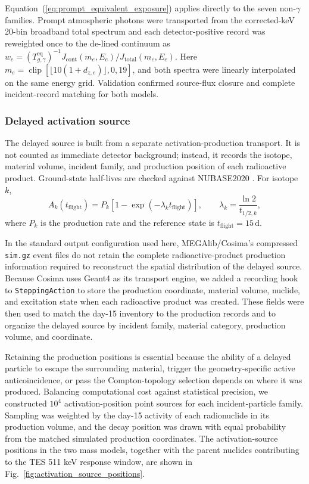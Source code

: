 \documentclass[11pt]{article}
\begin{document}
Equation~(\ref{eq:prompt_equivalent_exposure}) applies directly to the seven
non-$\gamma$ families. Prompt atmospheric photons were transported from the
corrected-keV 20-bin broadband total spectrum and each detector-positive record
was reweighted once to the de-lined continuum as
$w_e=(T^{\mathrm{eq}}_{g,\gamma})^{-1}
J_{\mathrm{cont}}(m_e,E_e)/J_{\mathrm{total}}(m_e,E_e)$. Here
$m_e=\operatorname{clip}[\lfloor10(1+d_{z,e})\rfloor,0,19]$, and both spectra
were linearly interpolated on the same energy grid. Validation confirmed
source-flux closure and complete incident-record matching for both models.

\endgroup

\subsubsection{Delayed activation source}
\label{subsec:delayed_source}

The delayed source is built from a separate activation-production transport. It
is not counted as immediate detector background; instead, it records the isotope,
material volume, incident family, and production position of each radioactive
product. Ground-state half-lives are checked against NUBASE2020
\cite{Kondev2021NUBASE}. For isotope $k$,
\begin{equation}
  A_k(t_{\mathrm{flight}})=P_k\left[1-\exp(-\lambda_k t_{\mathrm{flight}})\right],
  \qquad \lambda_k=\frac{\ln2}{t_{1/2,k}},
\end{equation}
where $P_k$ is the production rate and the reference state is
$t_{\mathrm{flight}}=15\,\mathrm{d}$.

\begingroup

In the standard output configuration used here,
MEGAlib/Cosima's compressed \texttt{sim.gz} event files do not retain the
complete radioactive-product production information required to reconstruct
the spatial distribution of the delayed source. Because Cosima uses Geant4 as
its transport engine, we added a recording hook to \texttt{SteppingAction} to
store the production coordinate, material volume, nuclide, and excitation
state when each radioactive product was created. These fields were then used
to match the day-15 inventory to the production records and to organize the
delayed source by incident family, material category, production volume, and
coordinate.

Retaining the production positions is essential because the ability of a
delayed particle to escape the surrounding material, trigger the
geometry-specific active anticoincidence, or pass the Compton-topology
selection depends on where it was produced. Balancing computational
cost against statistical precision, we constructed $10^4$ activation-position
point sources for each incident-particle family. Sampling was weighted by the
day-15 activity of each radionuclide in its production volume, and the decay
position was drawn with equal probability from the matched simulated
production coordinates. The activation-source positions in the two mass
models, together with the parent nuclides contributing to the TES 511 keV
response window, are shown in
Fig.~\ref{fig:activation_source_positions}.
\endgroup
\end{document}
